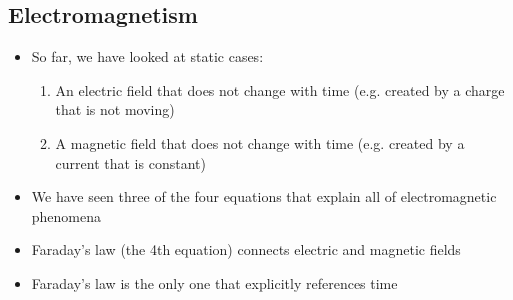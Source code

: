 \documentclass[aspectratio=169,
hyperref={colorlinks,urlcolor=blue}
]{beamer}
\begin{document}
\subsection{Electromagnetism}
\label{subsec:electromagnetism}
{
\begin{itemize}
\item So far, we have looked at static cases:
\begin{enumerate}
\item An electric field that does not change with time (e.g. created by a charge that is not moving)
\item A magnetic field that does not change with time (e.g. created by a current that is constant)
\end{enumerate}
\item<1> We have seen three of the four equations that explain all of electromagnetic phenomena
\item<2> Faraday’s law (the 4th equation) connects electric and magnetic fields
\item<2> Faraday’s law is the only one that explicitly references time
\end{itemize}
}
{

}

\end{document}
